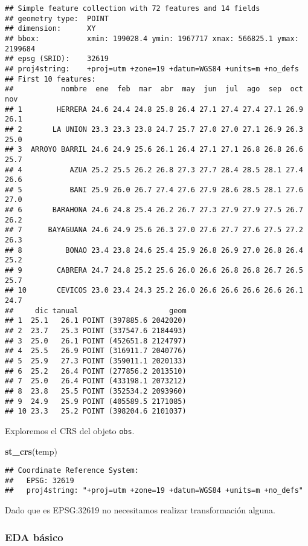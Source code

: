 \documentclass[11pt,]{article}
\newenvironment{Shaded}{\begin{snugshade}}{\end{snugshade}}
\newcommand{\KeywordTok}[1]{\textcolor[rgb]{0.13,0.29,0.53}{\textbf{#1}}}
\newcommand{\NormalTok}[1]{#1}
\begin{document}
\begin{verbatim}
## Simple feature collection with 72 features and 14 fields
## geometry type:  POINT
## dimension:      XY
## bbox:           xmin: 199028.4 ymin: 1967717 xmax: 566825.1 ymax: 2199684
## epsg (SRID):    32619
## proj4string:    +proj=utm +zone=19 +datum=WGS84 +units=m +no_defs
## First 10 features:
##           nombre  ene  feb  mar  abr  may  jun  jul  ago  sep  oct  nov
## 1        HERRERA 24.6 24.4 24.8 25.8 26.4 27.1 27.4 27.4 27.1 26.9 26.1
## 2       LA UNION 23.3 23.3 23.8 24.7 25.7 27.0 27.0 27.1 26.9 26.3 25.0
## 3  ARROYO BARRIL 24.6 24.9 25.6 26.1 26.4 27.1 27.1 26.8 26.8 26.6 25.7
## 4           AZUA 25.2 25.5 26.2 26.8 27.3 27.7 28.4 28.5 28.1 27.4 26.6
## 5           BANI 25.9 26.0 26.7 27.4 27.6 27.9 28.6 28.5 28.1 27.6 27.0
## 6       BARAHONA 24.6 24.8 25.4 26.2 26.7 27.3 27.9 27.9 27.5 26.7 26.2
## 7      BAYAGUANA 24.6 24.9 25.6 26.3 27.0 27.6 27.7 27.6 27.5 27.2 26.3
## 8          BONAO 23.4 23.8 24.6 25.4 25.9 26.8 26.9 27.0 26.8 26.4 25.2
## 9        CABRERA 24.7 24.8 25.2 25.6 26.0 26.6 26.8 26.8 26.7 26.5 25.7
## 10       CEVICOS 23.0 23.4 24.3 25.2 26.0 26.6 26.6 26.6 26.6 26.1 24.7
##     dic tanual                     geom
## 1  25.1   26.1 POINT (397885.6 2042020)
## 2  23.7   25.3 POINT (337547.6 2184493)
## 3  25.0   26.1 POINT (452651.8 2124797)
## 4  25.5   26.9 POINT (316911.7 2040776)
## 5  25.9   27.3 POINT (359011.1 2020133)
## 6  25.2   26.4 POINT (277856.2 2013510)
## 7  25.0   26.4 POINT (433198.1 2073212)
## 8  23.8   25.5 POINT (352534.2 2093960)
## 9  24.9   25.9 POINT (405589.5 2171085)
## 10 23.3   25.2 POINT (398204.6 2101037)
\end{verbatim}

Exploremos el CRS del objeto \texttt{obs}.

\begin{Shaded}
\begin{Highlighting}[]
\KeywordTok{st_crs}\NormalTok{(temp)}
\end{Highlighting}
\end{Shaded}

\begin{verbatim}
## Coordinate Reference System:
##   EPSG: 32619 
##   proj4string: "+proj=utm +zone=19 +datum=WGS84 +units=m +no_defs"
\end{verbatim}

Dado que es EPSG:32619 no necesitamos realizar transformación alguna.

\subsubsection{EDA básico}\label{eda-buxe1sico-1}
\end{document}
